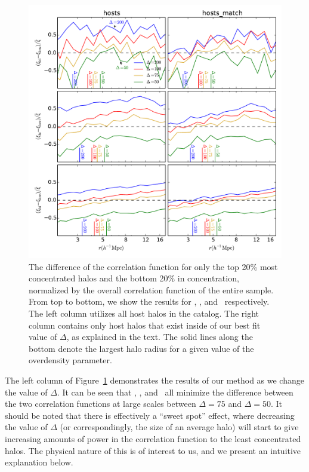 \documentclass[usenatbib,usegraphicx,letterpaper]{mn2e}
\begin{document}
\begin{figure}
	\centering
	\includegraphics[width=\textwidth]{all_cfhilow_z00_hostsvmatch.pdf}
	\caption{The difference of the correlation function for only the top 20\% most concentrated halos and the bottom 20\% in concentration, normalized by the overall correlation function of the entire sample. From top to bottom, we show the results for \simA, \simB, and \simC \ respectively. The left column utilizes all host halos in the catalog. The right column contains only host halos that exist inside of our best fit value of $\Delta$, as explained in the text. The solid lines along the bottom denote the largest halo radius for a given value of the overdensity parameter. }
	\label{fig:hvm_cfcompare}
\end{figure}


The left column of Figure~\ref{fig:hvm_cfcompare} demonstrates the results of our method as we change the value of $\Delta$. It can be seen that \simA, \simB, and \simC \ all minimize the difference between the two correlation functions at large scales between $\Delta = 75$ and $\Delta = 50$. It should be noted that there is effectively a ``sweet spot'' effect, where decreasing the value of $\Delta$ (or correspondingly, the size of an average halo) will start to give increasing amounts of power in the correlation function to the least concentrated halos. The physical nature of this is of interest to us, and we present an intuitive explanation below.
\end{document}
